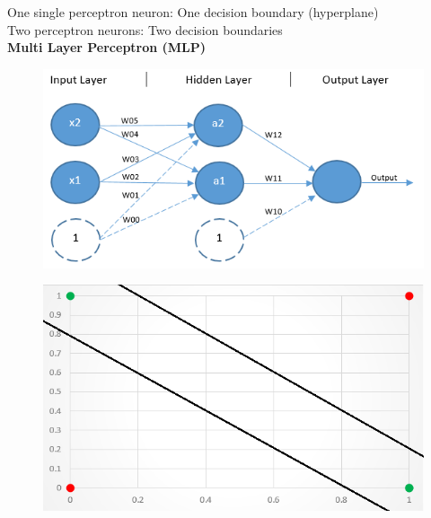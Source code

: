\documentclass[10pt, compress]{beamer}
\begin{document}
\begin{frame}
  One single perceptron neuron: One decision boundary (hyperplane) \\
  Two perceptron neurons: Two decision boundaries \\
  \textbf{Multi Layer Perceptron (MLP)}

  \begin{multicols}{2}
    \begin{figure}
      \includegraphics[width=1.2\linewidth]{imgs/mlp_1}
    \end{figure}

    \columnbreak

    \hfill \break
    \begin{figure}
      \includegraphics[width=.7\linewidth]{imgs/mlp_1b}
    \end{figure}
  \end{multicols}
\end{frame}
\end{document}
